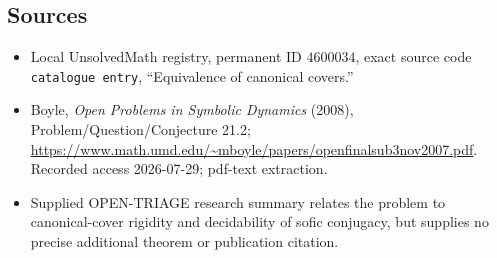 \documentclass[11pt]{article}
\begin{document}
\subsection{Sources}
\begin{itemize}
\item Local UnsolvedMath registry, permanent ID \(4600034\), exact source code \texttt{catalogue entry}, ``Equivalence of canonical covers.''
\item Boyle, \emph{Open Problems in Symbolic Dynamics} (2008), Problem/Question/Conjecture 21.2; \url{https://www.math.umd.edu/~mboyle/papers/openfinalsub3nov2007.pdf}. Recorded access 2026-07-29; pdf-text extraction.
\item Supplied OPEN-TRIAGE research summary relates the problem to canonical-cover rigidity and decidability of sofic conjugacy, but supplies no precise additional theorem or publication citation.
\end{itemize}
\end{document}
